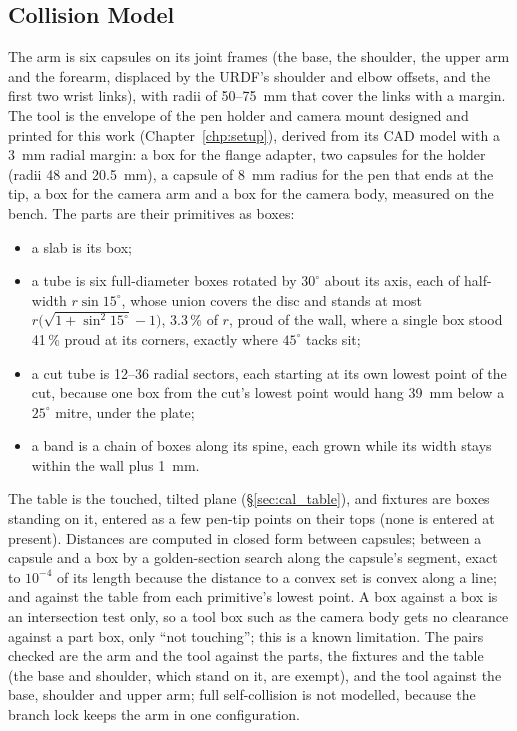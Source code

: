 \subsection{Collision Model}
\label{sec:mc_collision}
The arm is six capsules on its joint frames (the base, the shoulder, the upper arm and the forearm,
displaced by the URDF's shoulder and elbow offsets, and the first two wrist links), with radii of
50--75~mm that cover the links with a margin. The tool is the envelope of the pen holder and camera
mount designed and printed for this work (Chapter~\ref{chp:setup}), derived from its CAD model with a
3~mm radial margin: a box for the flange adapter, two capsules for the holder (radii 48 and 20.5~mm), a
capsule of 8~mm radius for the pen that ends at the tip, a box for the camera arm and a box for the
camera body, measured on the bench. The parts are their primitives as boxes:
\begin{itemize}
\item a slab is its box;
\item a tube is six full-diameter boxes rotated by $30^\circ$ about its axis, each of half-width
  $r\sin15^\circ$, whose union covers the disc and stands at most $r\big(\sqrt{1+\sin^2 15^\circ}-1\big)$,
  3.3\,\% of $r$, proud of the wall, where a single box stood 41\,\% proud at its corners, exactly where
  $45^\circ$ tacks sit;
\item a cut tube is 12--36 radial sectors, each starting at its own lowest point of the cut, because one
  box from the cut's lowest point would hang 39~mm below a $25^\circ$ mitre, under the plate;
\item a band is a chain of boxes along its spine, each grown while its width stays within the wall plus
  1~mm.
\end{itemize}
The table is the touched, tilted plane (\S\ref{sec:cal_table}), and fixtures are boxes standing on it,
entered as a few pen-tip points on their tops (none is entered at present). Distances are computed in closed form between capsules;
between a capsule and a box by a golden-section search along the capsule's segment, exact to
$10^{-4}$ of its length because the distance to a convex set is convex along a line; and against the
table from each primitive's lowest point. A box against a box is an intersection test only, so a tool
box such as the camera body gets no clearance against a part box, only ``not touching''; this is a
known limitation. The pairs checked are the arm and the tool against the parts, the fixtures and the
table (the base and shoulder, which stand on it, are exempt), and the tool against the base, shoulder
and upper arm; full self-collision is not modelled,
because the branch lock keeps the arm in one configuration.

